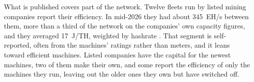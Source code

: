 What is published covers part of the network. Twelve fleets run by listed mining companies report their efficiency. In mid-2026 they had about 345~EH/s between them, more than a third of the network on the companies' own capacity figures, and they averaged 17~J/TH, weighted by hashrate \autocite{mara10q2026q2,bitdeer2026q2,cleanspark2026aug,riot2026q1prod}. %
That segment is self-reported, often from the machines' ratings rather than meters, and it leans toward efficient machines. Listed companies have the capital for the newest machines, two of them make their own, and some report the efficiency of only the machines they run, leaving out the older ones they own but have switched off. %

